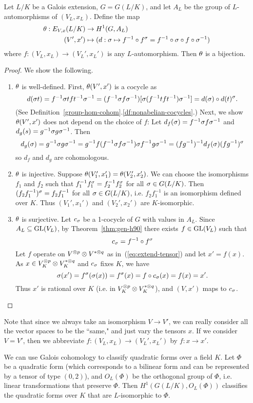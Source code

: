 \begin{thm}
Let $L/K$ be a Galois extension, $G=G(L/K)$, and let $A_L$ be the group of $L$-automorphisms of $(V_L,x_L)$.
Define the map
\begin{align*}
\theta:E_{V,x}(L/K)&\to H^1(G,A_L)\\
(V',x')&\mapsto (d:\sigma \mapsto f^{-1}\circ f^{\sigma }=f^{-1}\circ \sigma  \circ f \circ \sigma ^{-1})
\end{align*}
where $f:(V_L,x_L)\to (V_L',x_L')$ is any $L$-automorphism. 
Then $\theta$ is a bijection.
\end{thm}
\begin{proof}
We show the following.
\begin{enumerate}
\item $\theta$ is well-defined. First, $\theta(V',x')$ is a cocycle as
\[
d(\sigma t)=f^{-1}\sigma tft^{-1}\sigma^{-1}=(f^{-1}\sigma f\sigma^{-1})[\sigma (f^{-1}tft^{-1})\sigma^{-1}]=d(\sigma )\circ d(t)^{\sigma }.
\]
(See Definition~\ref{group-hom-cohom}.\ref{df:nonabelian-cocycles}.) 
Next, we show $\theta(V',x')$ does not depend on the choice of $f$: Let $d_f(\sigma )=f^{-1}\sigma f\sigma^{-1}$ and $d_g(s)=g^{-1}\sigma g\sigma^{-1}$. Then
\[
d_g(\sigma )=g^{-1}\sigma g\sigma^{-1}= g^{-1}f(f^{-1}\sigma f\sigma^{-1})\sigma f^{-1}g\sigma^{-1}
=(fg^{-1})^{-1}d_f(\sigma ) (fg^{-1})^{\sigma }
\]
so $d_f$ and $d_g$ are cohomologous.
\item $\theta$ is injective. Suppose $\theta(V_1',x_1')=\theta(V_2',x_2')$. We can choose the isomorphisms $f_1$ and $f_2$ such that $f_1^{-1}f_1^{\sigma }=f_2^{-1}f_2^{\sigma}$ for all $\sigma \in G(L/K)$. Then $(f_2f_1^{-1})^{\sigma }=f_2f_1^{-1}$ for all $\sigma \in G(L/K)$, i.e. $f_2f_1^{-1}$ is an isomorphism defined over $K$. %
Thus $(V_1',x_1')$ and $(V_2',x_2')$ are $K$-isomorphic.
\item $\theta$ is surjective. Let $c_{\sigma}$ be a 1-cocycle of $G$ with values in $A_L$. Since $A_L\subseteq \operatorname{GL}(V_L)$, by Theorem~\ref{thm:gen-h90} there exists $f\in \operatorname{GL}(V_L)$ such that
\[
c_{\sigma}=f^{-1}\circ f^{\sigma}
\]
Let $f$ operate on $V^{\otimes p}\otimes V^{*\otimes q}$ as in~(\ref{eq:extend-tensor}) and let $x'=f(x)$. As $x\in V_K^{\otimes p}\otimes V_K^{*\otimes q}$ and $c_{\sigma}$ fixes $K$, we have 
\[
\sigma(x')=f^{\sigma}(\sigma(x))=f^{\sigma}(x)=f\circ c_{\sigma}(x)=f(x)=x'.
\]
Thus $x'$ is rational over $K$ (i.e. in $V_K^{\otimes p}\otimes V_K^{*\otimes q}$), and $(V,x')$ maps to $c_{\sigma}$.
\end{enumerate}
\end{proof}
Note that since we always take an isomorphism $V\to V'$, we can really consider all the vector spaces to be the ``same," and just vary the tensors $x$. If we consider $V=V'$, then we abbreviate $f:(V_L,x_L)\to (V_L',x_L')$ by $f:x\to x'$.
\begin{ex}
We can use Galois cohomology to classify quadratic forms over a field $K$. Let $\Phi$ be a quadratic form (which corresponds to a bilinear form and can be represented by a tensor of type $(0,2)$), and $O_L(\Phi)$ be the orthogonal group of $\Phi$, i.e. linear transformations that preserve $\Phi$. Then $H^1(G(L/K),O_L(\Phi))$ classifies the quadratic forms over $K$ that are $L$-isomorphic to $\Phi$.
\end{ex}

